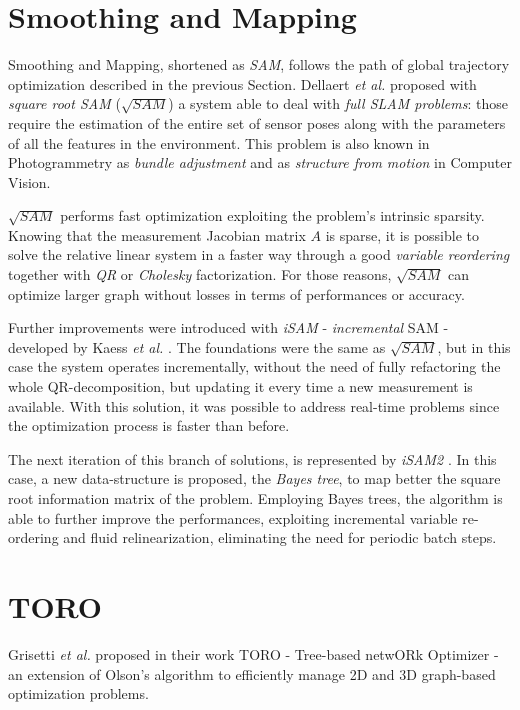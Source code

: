 \section{Smoothing and Mapping}\label{sec:sam}
Smoothing and Mapping, shortened as \textit{SAM}, follows the path of global trajectory optimization described in the previous Section. Dellaert \textit{et al.} proposed with \textit{square root SAM} ($\sqrt{SAM}$) \cite{dellaert2006square} a system able to deal with \textit{full SLAM problems}: those require the estimation of the entire set of sensor poses along with the parameters of all the features in the environment. This problem is also known in Photogrammetry as \textit{bundle adjustment} and as \textit{structure from motion} in Computer Vision.

$\sqrt{SAM}$ performs fast optimization exploiting the problem's intrinsic sparsity. Knowing that the measurement Jacobian matrix $A$ is sparse, it is possible to solve the relative linear system in a faster way through a good \textit{variable reordering} together with \textit{QR} or \textit{Cholesky} factorization. For those reasons, $\sqrt{SAM}$ can optimize larger graph without losses in terms of performances or accuracy.

Further improvements were introduced with \textit{iSAM} - \textit{incremental} SAM - developed by Kaess \textit{et al.} \cite{kaess2007isam}. The foundations were the same as $\sqrt{SAM}$, but in this case the system operates incrementally, without the need of fully refactoring the whole QR-decomposition, but updating it every time a new measurement is available. With this solution, it was possible to address real-time problems since the optimization process is faster than before. 

The next iteration of this branch of solutions, is represented by \textit{iSAM2} \cite{kaess2012isam2}. In this case, a new data-structure is proposed, the \textit{Bayes tree}, to map better the square root information matrix of the problem. Employing Bayes trees, the algorithm is able to further improve the performances, exploiting incremental variable re-ordering and fluid relinearization, eliminating the need for periodic batch steps. 

\section{TORO}\label{sec:toro}
Grisetti \textit{et al.} proposed in their work TORO \cite{toro} - Tree-based netwORk Optimizer - an extension of Olson's algorithm to efficiently manage 2D and 3D graph-based optimization problems. 

